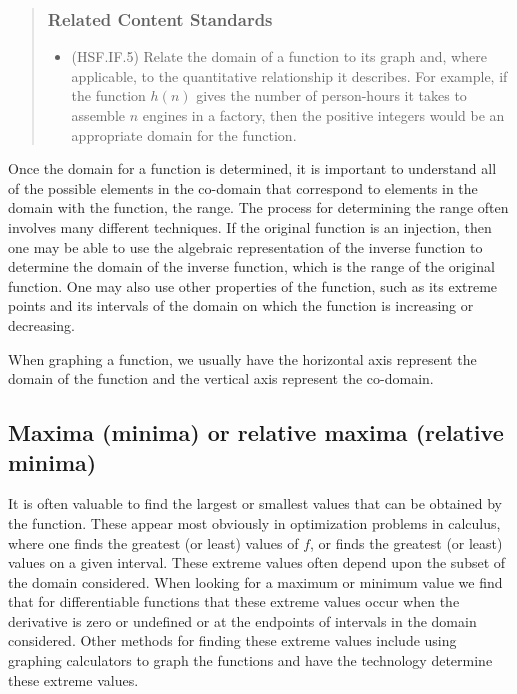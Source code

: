 \documentclass[
]{book}
\providecommand{\tightlist}{%
  \setlength{\itemsep}{0pt}\setlength{\parskip}{0pt}}
\theoremstyle{definition}
\theoremstyle{definition}
\theoremstyle{definition}
\theoremstyle{remark}
\begin{document}
\begin{quote}
\hypertarget{related-content-standards-39}{%
\subsubsection*{Related Content Standards}\label{related-content-standards-39}}

\begin{itemize}
\tightlist
\item
  (HSF.IF.5) Relate the domain of a function to its graph and, where applicable, to the quantitative relationship it describes. For example, if the function \(h(n)\) gives the number of person-hours it takes to assemble \(n\) engines in a factory, then the positive integers would be an appropriate domain for the function.
\end{itemize}
\end{quote}

Once the domain for a function is determined, it is important to understand all of the possible elements in the co-domain that correspond to elements in the domain with the function, the range. The process for determining the range often involves many different techniques. If the original function is an injection, then one may be able to use the algebraic representation of the inverse function to determine the domain of the inverse function, which is the range of the original function. One may also use other properties of the function, such as its extreme points and its intervals of the domain on which the function is increasing or decreasing.

When graphing a function, we usually have the horizontal axis represent the domain of the function and the vertical axis represent the co-domain.

\hypertarget{maxima-minima-or-relative-maxima-relative-minima}{%
\subsection{Maxima (minima) or relative maxima (relative minima)}\label{maxima-minima-or-relative-maxima-relative-minima}}

It is often valuable to find the largest or smallest values that can be obtained by the function. These appear most obviously in optimization problems in calculus, where one finds the greatest (or least) values of \(f\), or finds the greatest (or least) values on a given interval. These extreme values often depend upon the subset of the domain considered. When looking for a maximum or minimum value we find that for differentiable functions that these extreme values occur when the derivative is zero or undefined or at the endpoints of intervals in the domain considered. Other methods for finding these extreme values include using graphing calculators to graph the functions and have the technology determine these extreme values.
\end{document}
